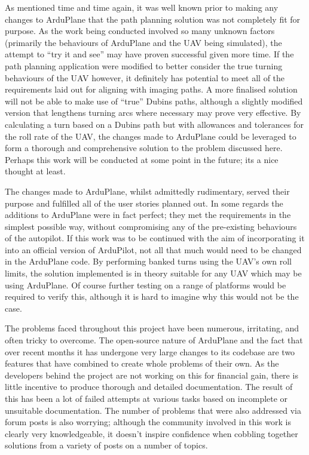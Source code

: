 As mentioned time and time again, it was well known prior to making any changes to ArduPlane that the path planning solution was not completely fit for purpose. As the work being conducted involved so many unknown factors (primarily the behaviours of ArduPlane and the UAV being simulated), the attempt to ``try it and see'' may have proven successful given more time. If the path planning application were modified to better consider the true turning behaviours of the UAV however, it definitely has potential to meet all of the requirements laid out for aligning with imaging paths. A more finalised solution will not be able to make use of ``true'' Dubins paths, although a slightly modified version that lengthens turning arcs where necessary may prove very effective. By calculating a turn based on a Dubins path but with allowances and tolerances for the roll rate of the UAV, the changes made to ArduPlane could be leveraged to form a thorough and comprehensive solution to the problem discussed here. Perhaps this work will be conducted at some point in the future; its a nice thought at least.

The changes made to ArduPlane, whilst admittedly rudimentary, served their purpose and fulfilled all of the user stories planned out. In some regards the additions to ArduPlane were in fact perfect; they met the requirements in the simplest possible way, without compromising any of the pre-existing behaviours of the autopilot. If this work was to be continued with the aim of incorporating it into an official version of ArduPilot, not all that much would need to be changed in the ArduPlane code. By performing banked turns using the UAV's own roll limits, the solution implemented is in theory suitable for any UAV which may be using ArduPlane. Of course further testing on a range of platforms would be required to verify this, although it is hard to imagine why this would not be the case.

The problems faced throughout this project have been numerous, irritating, and often tricky to overcome. The open-source nature of ArduPlane and the fact that over recent months it has undergone very large changes to its codebase are two features that have combined to create whole problems of their own. As the developers behind the project are not working on this for financial gain, there is little incentive to produce thorough and detailed documentation. The result of this has been a lot of failed attempts at various tasks based on incomplete or unsuitable documentation. The number of problems that were also addressed via forum posts is also worrying; although the community involved in this work is clearly very knowledgeable, it doesn't inspire confidence when cobbling together solutions from a variety of posts on a number of topics.

